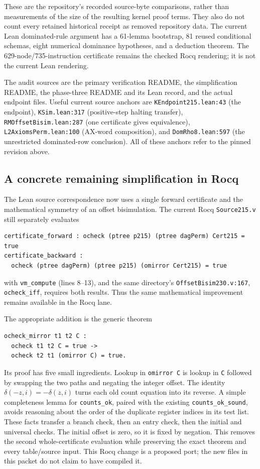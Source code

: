 These are the repository's recorded source-byte comparisons, rather than
measurements of the size of the resulting kernel proof terms. They also
do not count every retained historical receipt as removed repository data.\cite{simplification}
The current Lean dominated-rule argument has a 61-lemma bootstrap,
81 reused conditional schemas, eight numerical dominance hypotheses, and
a deduction theorem. The 629-node/735-instruction certificate remains
the checked Rocq rendering; it is not the current Lean rendering.

The audit sources are the primary verification README, the simplification
README, the phase-three README and its Lean record, and the actual endpoint
files. Useful current source anchors are
\texttt{KEndpoint215.lean:43} (the endpoint),
\texttt{KSim.lean:317} (positive-step halting transfer),
\texttt{RMOffsetBisim.lean:287} (one certificate gives equivalence),
\texttt{L2AxiomsPerm.lean:100} (AX-word composition), and
\texttt{DomRho8.lean:597} (the unrestricted dominated-row conclusion).
All of these anchors refer to the pinned revision above.

\subsection{A concrete remaining simplification in Rocq}

The Lean source correspondence now uses a single forward certificate and
the mathematical symmetry of an offset bisimulation. The current Rocq
\texttt{Source215.v} still separately evaluates
\begin{verbatim}
certificate_forward : ocheck (ptree p215) (ptree dagPerm) Cert215 = true
certificate_backward :
  ocheck (ptree dagPerm) (ptree p215) (omirror Cert215) = true
\end{verbatim}
with \texttt{vm\_compute} (lines 8--13), and the same directory's
\texttt{OffsetBisim230.v:167}, \texttt{ocheck\_iff}, requires both results.
Thus the same mathematical
improvement remains available in the Rocq lane.

The appropriate addition is the generic theorem
\begin{verbatim}
ocheck_mirror t1 t2 C :
  ocheck t1 t2 C = true ->
  ocheck t2 t1 (omirror C) = true.
\end{verbatim}
Its proof has five small ingredients. Lookup in \texttt{omirror C} is
lookup in \texttt{C} followed by swapping the two paths and negating the
integer offset. The identity
$\delta(-z,i)=-\delta(z,i)$ turns each old count equation into its reverse.
A simple completeness lemma for \texttt{counts\_ok}, paired with the
existing \texttt{counts\_ok\_sound}, avoids reasoning about the order of
the duplicate register indices in its test list. These facts transfer a
branch check, then an entry check, then the initial and universal checks.
The initial offset is zero, so it is fixed by negation. This removes the
second whole-certificate evaluation while preserving the exact theorem
and every table/source input. This Rocq change is a proposed port; the
new files in this packet do not claim to have compiled it.

